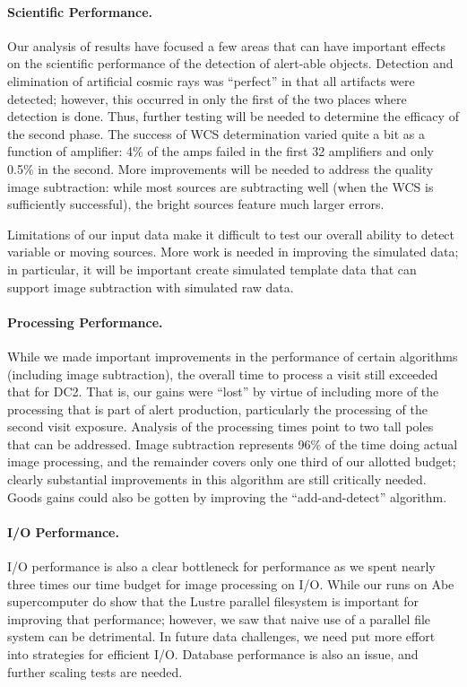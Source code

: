 \paragraph{Scientific Performance.}  Our analysis of results have
focused a few areas that can have important effects on the scientific
performance of the detection of alert-able objects.  Detection and
elimination of artificial cosmic rays was ``perfect'' in that all
artifacts were detected; however, this occurred in only the first of
the two places where detection is done.  Thus, further testing will be
needed to determine the efficacy of the second phase.  The success of
WCS determination varied quite a bit as a function of amplifier: 4\%
of the amps failed in the first 32 amplifiers and only 0.5\% in the
second.  More improvements will be needed to address the quality image
subtraction:  while most sources are subtracting well (when the WCS is
sufficiently successful),  the bright sources feature much larger
errors.  

Limitations of our input data make it difficult to test our overall
ability to detect variable or moving sources.  More work is needed in
improving the simulated data; in particular, it will be important
create simulated template data that can support image subtraction with
simulated raw data.  

\paragraph{Processing Performance.}  While we made important
improvements in the performance of certain algorithms (including image
subtraction), the overall time to process a visit still exceeded that
for DC2.  That is, our gains were ``lost'' by virtue of
including more of the processing that is part of alert production,
particularly the processing of the second visit exposure.  Analysis of
the processing times point to two tall poles that can be addressed.
Image subtraction represents 96\% of the time doing actual image
processing, and the remainder covers only one third of our allotted
budget; clearly substantial improvements in this algorithm are still
critically needed.  Goods gains could also be gotten by improving the
``add-and-detect'' algorithm.  

\paragraph{I/O Performance.}  I/O performance is also a clear
bottleneck for performance as we spent nearly three times our time
budget for image processing on I/O.  While our runs on Abe
supercomputer do show that the Lustre parallel filesystem is important
for improving that performance; however, we saw that naive use of a
parallel file system can be detrimental.  In future data challenges,
we need put more effort into strategies for efficient I/O.  Database
performance is also an issue, and further scaling tests are needed.  


